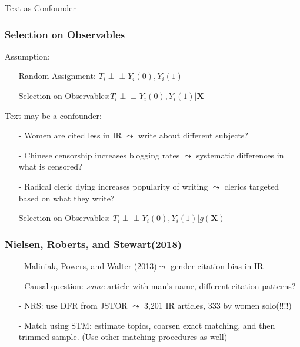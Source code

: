 \documentclass[xcolor=dvipsnames]{beamer}
\newcommand{\indep}{\mbox{$\perp\!\!\!\perp$}}
\begin{document}
\begin{frame}

\begin{center}
\end{center}

\end{frame}


\begin{frame}

\huge 
Text as Confounder

\end{frame}


\begin{frame}
\frametitle{Selection on Observables}

Assumption:
\begin{itemize}
\item[] \alert{Random Assignment}: $T_{i} \indep Y_{i}(0), Y_{i}(1) $
\item[] \alert{Selection on Observables}:$T_{i} \indep Y_{i}(0), Y_{i}(1) | \boldsymbol{X}$ 
\end{itemize}

Text may be a confounder:
\begin{itemize}
	\item[-] Women are cited less in IR $\leadsto$ write about different subjects?
	\item[-] Chinese censorship increases blogging rates $\leadsto$ systematic differences in what is censored?
	\item[-] Radical cleric dying increases popularity of writing $\leadsto$ clerics targeted based on what they write?
\end{itemize}


\begin{itemize}
	\item[] \alert{Selection on Observables}: $T_{i} \indep Y_{i}(0), Y_{i}(1) | g(\boldsymbol{X})$
\end{itemize}

\end{frame}

\begin{frame}
\frametitle{Nielsen, Roberts, and Stewart(2018)}
\begin{itemize}
	\item[-] Maliniak, Powers, and Walter (2013)$\leadsto$ gender citation bias in IR
	\item[-] Causal question: \emph{same} article with man's name, different citation patterns?
	\item[-] NRS: use DFR from JSTOR $\leadsto$ 3,201 IR articles, 333 by women solo(!!!!)
	\item[-] Match using STM: estimate topics, coarsen exact matching, and then trimmed sample. (Use other matching procedures as well)
\end{itemize}
\end{frame}
\end{document}
